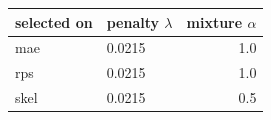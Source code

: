 
\begin{tabular}{llr}
\toprule
selected on & penalty $\lambda$ & mixture $\alpha$\\
\midrule
mae & 0.0215 & 1.0\\
rps & 0.0215 & 1.0\\
skel & 0.0215 & 0.5\\
\bottomrule
\end{tabular}
